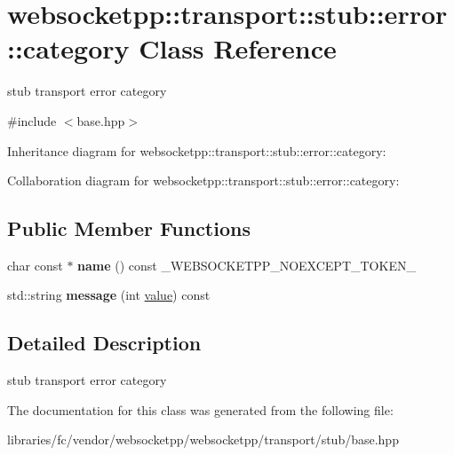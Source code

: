 \hypertarget{classwebsocketpp_1_1transport_1_1stub_1_1error_1_1category}{}\section{websocketpp\+:\+:transport\+:\+:stub\+:\+:error\+:\+:category Class Reference}
\label{classwebsocketpp_1_1transport_1_1stub_1_1error_1_1category}


stub transport error category  




{\ttfamily \#include $<$base.\+hpp$>$}



Inheritance diagram for websocketpp\+:\+:transport\+:\+:stub\+:\+:error\+:\+:category\+:


Collaboration diagram for websocketpp\+:\+:transport\+:\+:stub\+:\+:error\+:\+:category\+:
\subsection*{Public Member Functions}
\begin{DoxyCompactItemize}
\item 
\mbox{\label{classwebsocketpp_1_1transport_1_1stub_1_1error_1_1category_a9ba015d3bbd5b18d1cf8d64cd0a60e31}} 
char const  $\ast$ {\bfseries name} () const \+\_\+\+W\+E\+B\+S\+O\+C\+K\+E\+T\+P\+P\+\_\+\+N\+O\+E\+X\+C\+E\+P\+T\+\_\+\+T\+O\+K\+E\+N\+\_\+
\item 
\mbox{\label{classwebsocketpp_1_1transport_1_1stub_1_1error_1_1category_ae557fdbd7233cab11d84375f1e442618}} 
std\+::string {\bfseries message} (int \mbox{\hyperlink{namespacewebsocketpp_1_1transport_1_1stub_1_1error_abff42d9e608f90864af8d628f6932022}{value}}) const
\end{DoxyCompactItemize}


\subsection{Detailed Description}
stub transport error category 

The documentation for this class was generated from the following file\+:\begin{DoxyCompactItemize}
\item 
libraries/fc/vendor/websocketpp/websocketpp/transport/stub/base.\+hpp\end{DoxyCompactItemize}
